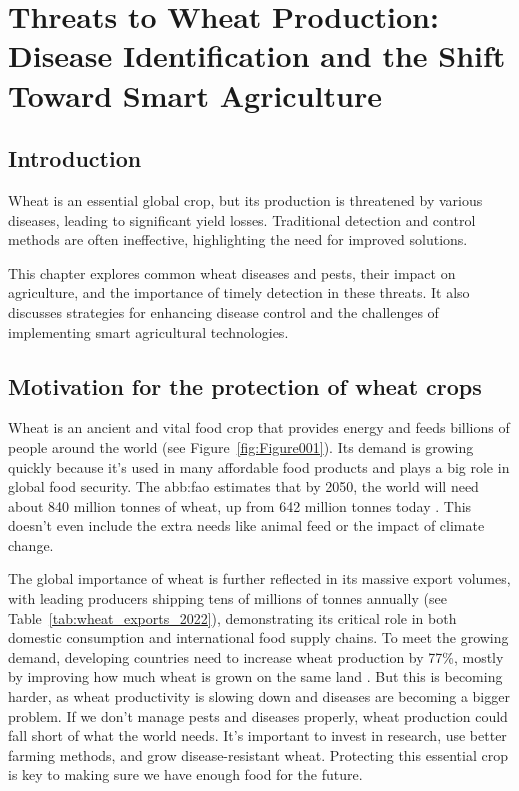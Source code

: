 \chapter{Threats to Wheat Production: Disease Identification and the Shift Toward Smart Agriculture}

\section{Introduction}

Wheat is an essential global crop, but its production is threatened by various diseases, leading to significant yield losses. Traditional detection and control methods are often ineffective, highlighting the need for improved solutions. 

This chapter explores common wheat diseases and pests, their impact on agriculture, and the importance of timely detection in these threats. It also discusses strategies for enhancing disease control and the challenges of implementing smart agricultural technologies.


\section{Motivation for the protection of wheat crops}

Wheat is an ancient and vital food crop that provides energy and feeds billions of people around the world (see Figure~\ref{fig:Figure001}). Its demand is growing quickly because it’s used in many affordable food products and plays a big role in global food security. The \gls{abb:fao} estimates that by 2050, the world will need about 840 million tonnes of wheat, up from 642 million tonnes today \parencite{sharma2015wheat}. This doesn’t even include the extra needs like animal feed or the impact of climate change.

The global importance of wheat is further reflected in its massive export volumes, with leading producers shipping tens of millions of tonnes annually (see Table~\ref{tab:wheat_exports_2022}), demonstrating its critical role in both domestic consumption and international food supply chains. To meet the growing demand, developing countries need to increase wheat production by 77\%, mostly by improving how much wheat is grown on the same land \parencite{sharma2015wheat}.  But this is becoming harder, as wheat productivity is slowing down and diseases are becoming a bigger problem. If we don’t manage pests and diseases properly, wheat production could fall short of what the world needs. It’s important to invest in research, use better farming methods, and grow disease-resistant wheat. Protecting this essential crop is key to making sure we have enough food for the future.


